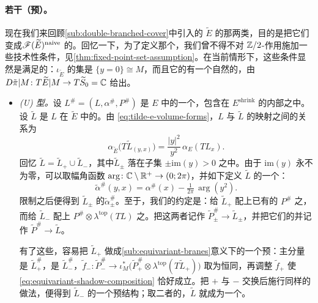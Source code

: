 \paragraph{若干（预）\trEquivariant{}\trBrane{}。}\label{sub:pre-equivariant-branes}
现在我们来回顾\cref{sub:double-branched-cover}中引入的 $\widetilde{E}$ 的那两类\trLagrange\trSubmanifold，目的是把它们变成\trEquivariant\trFukayaCategory{}$\mathscr{F}(\widetilde{E})^{\mathrm{naive}}$ 的\trObject。回忆一下，为了定义那个\trCategory，我们曾不得不对 $\mathbb{Z}/2$-作用施加一些技术性条件，见\cref{thm:fixed-point-set-assumption}。在当前情形下，这些条件显然是满足的：$\iota_{\widetilde{E}}$ 的\trFixedPoint{}集是 $\{y=0\}\cong M$，而且它的\trNormalBundle{}有一个自然的\trTrivialization，由 $D\tilde{\pi}|M\colon T\widetilde{E}|M\to T\widetilde{S}_0=\mathbb{C}$ 给出。
\begin{itemize}
\item \emph{(U) 型。}设 $L^{\#}=(L,\alpha^{\#},P^{\#})$ 是 $E$ 中的一个\trExactLagrangianBrane，包含在 $E^{\mathrm{shrink}}$ 的内部之中。设 $\widetilde{L}$ 是 $L$ 在 $\widetilde{E}$ 中的\trPreimage。由 \eqref{eq:tilde-e-volume-forms}，$L$ 与 $\widetilde{L}$ 的\trSquaredPhase{}映射之间的关系为
\begin{equation*}
\alpha_{\widetilde{E}}\bigl(T\widetilde{L}_{(y,x)}\bigr)=\frac{|y|^2}{y^2}\,\alpha_E(TL_x).
\end{equation*}
回忆 $\widetilde{L}=\widetilde{L}_+\cup\widetilde{L}_-$，其中\trConnectedComponent{}$\widetilde{L}_{\pm}$ 落在子集 $\pm\mathrm{im}(y)>0$ 之中。由于 $\mathrm{im}(y)$ 永不为零，可以取幅角函数 $\arg\colon\mathbb{C}\setminus\mathbb{R}^+\to(0;2\pi)$，并如下定义 $\widetilde{L}$ 的一个\trGrading：
\begin{equation}\label{eq:tilde-l-grading}
\tilde{\alpha}^{\#}(y,x)=\alpha^{\#}(x)-\tfrac{1}{2\pi}\,\arg(y^2).
\end{equation}
限制之后便得到 $\widetilde{L}_{\pm}$ 的\trGrading{}$\tilde{\alpha}^{\#}_{\pm}$。至于\trPinStructure，我们的约定是：给 $\widetilde{L}_+$ 配上已有的 $P^{\#}$ 之\trPullback，而给 $\widetilde{L}_-$ 配上 $P^{\#}\otimes\lambda^{\mathrm{top}}(TL)$ 之\trPullback。把这两者记作 $\widetilde{P}^{\#}_{\pm}\to\widetilde{L}_{\pm}$，并把它们的并记作 $\widetilde{P}^{\#}\to\widetilde{L}$。

有了这些，容易把 $\widetilde{L}_+$ 做成\cref{sub:equivariant-branes}意义下的一个预\trEquivariant{}\trBrane：主分量是 $\widetilde{L}^{\#}_+$，\trShadow{}是 $\widetilde{L}^{\#}_-$，\trIsomorphism{}$\widetilde{f}_-\colon\widetilde{P}^{\#}_-\to\iota_M^*\bigl(\widetilde{P}^{\#}_+\otimes\lambda^{\mathrm{top}}(T\widetilde{L}_+)\bigr)$ 取为恒同，再调整 $\widetilde{f}_+$ 使 \eqref{eq:equivariant-shadow-composition} 恰好成立。把 $+$ 与 $-$ 交换后施行同样的做法，便得到 $\widetilde{L}_-$ 的一个预\trEquivariant{}\trBrane{}结构；取二者的\trDisjointUnion，$\widetilde{L}$ 就成为一个\trEquivariant{}\trBrane。
\end{itemize}

